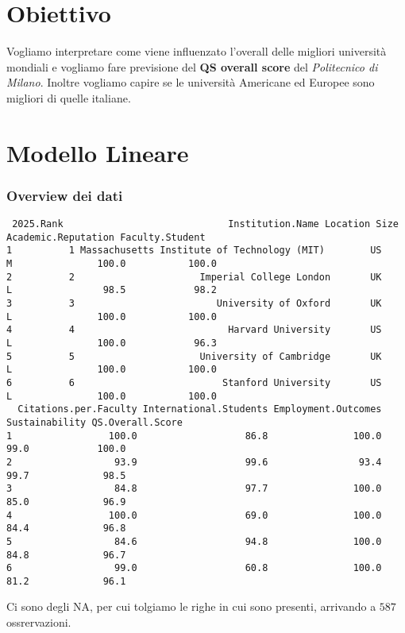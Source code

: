 \documentclass{beamer}
\begin{document}
\section{Obiettivo}
\begin{frame}
    Vogliamo interpretare come viene influenzato l'overall delle migliori università mondiali e vogliamo fare previsione del \textbf{QS overall score} del \textit{Politecnico di Milano}.
    Inoltre vogliamo capire se le università Americane ed Europee sono migliori di quelle italiane.
\end{frame}


\section{Modello Lineare}
\begin{frame}[fragile]
\frametitle{Overview dei dati}
\TINY
	\begin{verbatim}
 2025.Rank                             Institution.Name Location Size Academic.Reputation Faculty.Student
1          1 Massachusetts Institute of Technology (MIT)        US    M               100.0           100.0
2          2                      Imperial College London       UK    L                98.5            98.2
3          3                         University of Oxford       UK    L               100.0           100.0
4          4                           Harvard University       US    L               100.0            96.3
5          5                      University of Cambridge       UK    L               100.0           100.0
6          6                          Stanford University       US    L               100.0           100.0
  Citations.per.Faculty International.Students Employment.Outcomes Sustainability QS.Overall.Score
1                 100.0                   86.8               100.0           99.0            100.0
2                  93.9                   99.6                93.4           99.7             98.5
3                  84.8                   97.7               100.0           85.0             96.9
4                 100.0                   69.0               100.0           84.4             96.8
5                  84.6                   94.8               100.0           84.8             96.7
6                  99.0                   60.8               100.0           81.2             96.1
	\end{verbatim}

	{\normalsize Ci sono degli NA, per cui tolgiamo le righe in cui sono presenti, arrivando a $587$ ossrervazioni.}
\end{frame}
\end{document}
